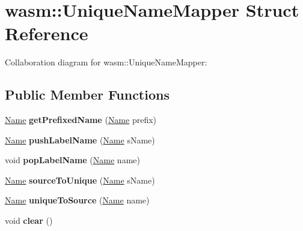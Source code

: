 \hypertarget{structwasm_1_1_unique_name_mapper}{}\section{wasm\+:\+:Unique\+Name\+Mapper Struct Reference}
\label{structwasm_1_1_unique_name_mapper}


Collaboration diagram for wasm\+:\+:Unique\+Name\+Mapper\+:
\subsection*{Public Member Functions}
\begin{DoxyCompactItemize}
\item 
\mbox{\label{structwasm_1_1_unique_name_mapper_a51740094f21a48226975e4bd4944b05a}} 
\mbox{\hyperlink{structwasm_1_1_name}{Name}} {\bfseries get\+Prefixed\+Name} (\mbox{\hyperlink{structwasm_1_1_name}{Name}} prefix)
\item 
\mbox{\label{structwasm_1_1_unique_name_mapper_a9ce52885a7093307a0d3842299f9ed69}} 
\mbox{\hyperlink{structwasm_1_1_name}{Name}} {\bfseries push\+Label\+Name} (\mbox{\hyperlink{structwasm_1_1_name}{Name}} s\+Name)
\item 
\mbox{\label{structwasm_1_1_unique_name_mapper_a664e3d903e0da837d41dcc217c4ff62a}} 
void {\bfseries pop\+Label\+Name} (\mbox{\hyperlink{structwasm_1_1_name}{Name}} name)
\item 
\mbox{\label{structwasm_1_1_unique_name_mapper_a9c88dfc0b2411ac4246cfeed18dc27c2}} 
\mbox{\hyperlink{structwasm_1_1_name}{Name}} {\bfseries source\+To\+Unique} (\mbox{\hyperlink{structwasm_1_1_name}{Name}} s\+Name)
\item 
\mbox{\label{structwasm_1_1_unique_name_mapper_a8f851973730c13bdfe016b426c62b63e}} 
\mbox{\hyperlink{structwasm_1_1_name}{Name}} {\bfseries unique\+To\+Source} (\mbox{\hyperlink{structwasm_1_1_name}{Name}} name)
\item 
\mbox{\label{structwasm_1_1_unique_name_mapper_aafb0a2475cb6ad195c36b15732ddf2f9}} 
void {\bfseries clear} ()
\end{DoxyCompactItemize}
